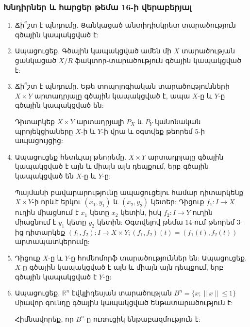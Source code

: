 \bigskip
\bigskip
\subsubsection*{Խնդիրներ և հարցեր թեմա 16-ի վերաբերյալ}

\begin{enumerate}[label=\thesection.\arabic*.]



\item Ճի՞շտ է պնդումը. Ցանկացած անտիդիսկրետ տարածություն գծային կապակցված է:

\item Ապացուցեք. Գծային կապակցված ամեն մի $X$ տարածության ցանկացած $X/R$ ֆակտոր-տարածություն գծային կապակցված է:

\item Ճի՞շտ է պնդումը. Եթե տոպոլոգիական տարածությունների $X \times Y$ արտադրյալը գծային կապակցված է, ապա $X$-ը և $Y$-ը գծային կապակցված են:
\begin{hint}
Դիտարկեք $X \times Y$ արտադրյալի $P_X$ և $P_Y$ կանոնական պրոյեկցիաները $X$-ի և $Y$-ի վրա և օգտվեք թեորեմ 5-ի ապացույցից:
\end{hint}

\item Ապացուցեք հետևյալ թեորեմը. $X \times Y$ արտադրյալը գծային կապակցված է այն և միայն այն դեպքում, երբ գծային կապակցված են $X$-ը և $Y$-ը:
\begin{hint}
Պայմանի բավարարությունը ապացուցելու համար դիտարկենք $X \times Y$-ի որևէ երկու $(x_1, y_1)$ և $(x_2, y_2)$ կետեր: Դիցուք $f_1: I \to X$ ուղին միացնում է $x_1$ կետը $x_2$ կետին, իսկ $f_2: I \to Y$ ուղին միացնում է $y_1$ կետը $y_2$ կետին: Օգտվելով թեմա 14-ում թեորեմ 3-ից դիտարկեք $(f_1, f_2): I \to X \times Y; (f_1, f_2)(t) = (f_1(t), f_2(t))$ արտապատկերումը:
\end{hint}

\item Դիցուք $X$-ը և $Y$-ը հոմեոմորֆ տարածություններ են: Ապացուցեք. $X$-ը գծային կապակցված է այն և միայն այն դեպքում, երբ գծային կապակցված է $Y$-ը:

\item Ապացուցեք. $\mathbb{R}^n$ էվկլիդեսյան տարածության $B^n = \{x; \|x\| \le 1\}$ միավոր գունդը գծային կապակցված ենթատարածություն է:
\begin{hint}
Հիմնավորեք, որ $B^n$-ը ուռուցիկ ենթաբազմություն է:
\end{hint}


\end{enumerate}
